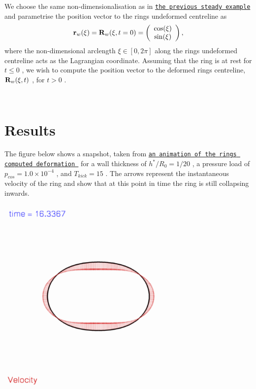 \begin{center}
\begin{longtabu}
We choose the same non-\/dimensionalisation as in \href{../../steady_ring/html/index.html}{\tt the previous steady example} and parametrise the position vector to the ring\textquotesingle{}s undeformed centreline as \[ {\bf r}_w(\xi) = {\bf R}_w(\xi,t=0) = \left( \begin{array}{c} \cos(\xi) \\ \sin(\xi) \end{array} \right), \] where the non-\/dimensional arclength $ \xi \in [0,2\pi] $ along the ring\textquotesingle{}s undeformed centreline acts as the Lagrangian coordinate. Assuming that the ring is at rest for $ t\le 0 $ , we wish to compute the position vector to the deformed ring\textquotesingle{}s centreline, $ {\bf R}_w(\xi,t) $ , for $ t > 0 $ .

\\
\end{longtabu}
\end{center} 



 

\hypertarget{index_results}{}\section{Results}\label{index_results}
The figure below shows a snapshot, taken from \href{../figures/unsteady_ring.avi}{\tt an animation of the ring\textquotesingle{}s computed deformation } for a wall thickness of $ h^*/R_0 = 1/20$ , a pressure load of $ p_{cos} = 1.0 \times 10^{-4}$ , and $ T_{kick} = 15 $ . The arrows represent the instantaneous velocity of the ring and show that at this point in time the ring is still collapsing inwards.

 
\begin{DoxyImage}
\includegraphics[width=0.75\textwidth]{unsteady_ring}
\end{DoxyImage}



